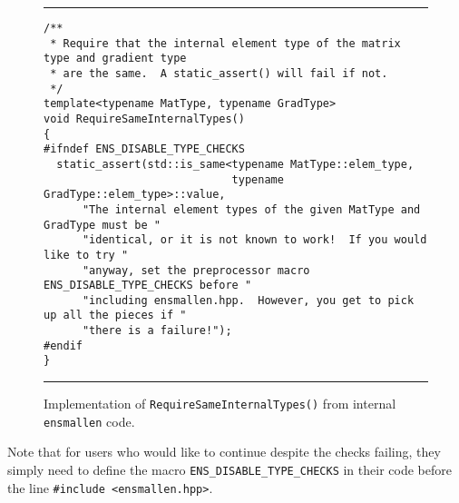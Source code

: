\begin{figure}[t]
\hrule
\vspace{1ex}
\begin{verbatim}
/**
 * Require that the internal element type of the matrix type and gradient type
 * are the same.  A static_assert() will fail if not.
 */
template<typename MatType, typename GradType>
void RequireSameInternalTypes()
{
#ifndef ENS_DISABLE_TYPE_CHECKS
  static_assert(std::is_same<typename MatType::elem_type,
                             typename GradType::elem_type>::value,
      "The internal element types of the given MatType and GradType must be "
      "identical, or it is not known to work!  If you would like to try "
      "anyway, set the preprocessor macro ENS_DISABLE_TYPE_CHECKS before "
      "including ensmallen.hpp.  However, you get to pick up all the pieces if "
      "there is a failure!");
#endif
}
\end{verbatim}
\hrule
\vspace*{-0.5em}
\caption{Implementation of {\tt RequireSameInternalTypes()} from internal
{\tt ensmallen} code.
}
\label{fig:rsit}
\end{figure}

Note that for users who would like to continue despite the checks failing, they
simply need to define the macro {\tt ENS\_DISABLE\_TYPE\_CHECKS} in their code
before the line {\tt \#include <ensmallen.hpp>}.
